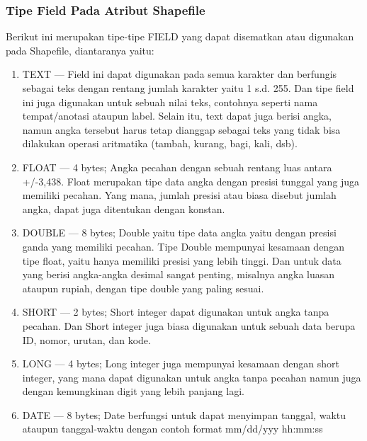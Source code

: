 \subsubsection{Tipe Field Pada Atribut Shapefile}
       Berikut ini merupakan tipe-tipe FIELD yang dapat disematkan atau digunakan pada Shapefile, diantaranya yaitu:
\begin{enumerate}
    \item TEXT — Field ini dapat digunakan pada semua karakter dan berfungis sebagai teks dengan rentang jumlah karakter yaitu 1 s.d.              255. Dan tipe field ini juga digunakan untuk sebuah nilai teks, contohnya seperti nama tempat/anotasi ataupun label. Selain              itu, text dapat juga berisi angka, namun angka tersebut harus tetap dianggap sebagai teks yang tidak bisa dilakukan operasi              aritmatika (tambah, kurang, bagi, kali, dsb).
    \item FLOAT — 4 bytes; Angka pecahan dengan sebuah rentang luas antara +/-3,438. Float merupakan tipe data angka dengan presisi                tunggal yang juga memiliki pecahan. Yang mana, jumlah presisi atau biasa disebut jumlah angka, dapat juga ditentukan dengan              konstan.
    \item DOUBLE — 8 bytes; Double yaitu tipe data angka yaitu dengan presisi ganda yang memiliki pecahan. Tipe Double mempunyai                  kesamaan  dengan tipe float, yaitu hanya memiliki presisi yang lebih tinggi. Dan untuk data yang berisi angka-angka desimal              sangat penting, misalnya angka luasan ataupun rupiah, dengan tipe double yang paling sesuai.
    \item SHORT — 2 bytes; Short integer dapat digunakan untuk angka tanpa pecahan. Dan Short integer juga biasa digunakan untuk                   sebuah data berupa ID, nomor, urutan, dan kode.
    \item LONG — 4 bytes; Long integer juga mempunyai kesamaan dengan short integer, yang mana dapat digunakan untuk angka tanpa                  pecahan namun juga  dengan kemungkinan digit yang lebih panjang lagi.
    \item DATE — 8 bytes; Date berfungsi untuk dapat menyimpan tanggal, waktu ataupun tanggal-waktu dengan contoh format mm/dd/yyy                hh:mm:ss
\end{enumerate}

